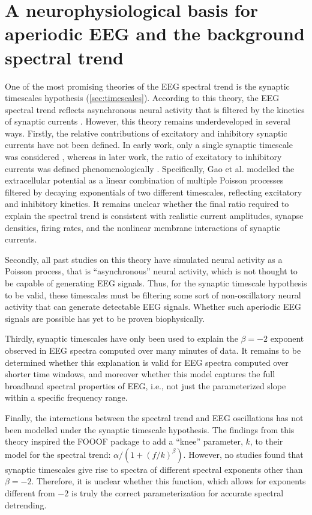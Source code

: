 \chapter{A neurophysiological basis for aperiodic EEG and the background spectral trend} \label{sec:natcomms}

One of the most promising theories of the EEG spectral trend is the synaptic timescales hypothesis (\autoref{sec:timescales}). According to this theory, the EEG spectral trend reflects asynchronous neural activity that is filtered by the kinetics of synaptic currents \cite{Bedard2006,Miller2009, Gao2017}. However, this theory remains underdeveloped in several ways. Firstly, the relative contributions of excitatory and inhibitory synaptic currents have not been defined. In early work, only a single synaptic timescale was considered \cite{Bedard2006,Miller2009}, whereas in later work, the ratio of excitatory to inhibitory currents was defined phenomenologically \cite{Gao2017}. Specifically, Gao et al. \cite{Gao2017} modelled the extracellular potential as a linear combination of multiple Poisson processes filtered by decaying exponentials of two different timescales, reflecting excitatory and inhibitory kinetics. It remains unclear whether the final ratio required to explain the spectral trend is consistent with realistic current amplitudes, synapse densities, firing rates, and the nonlinear membrane interactions of synaptic currents. 

Secondly, all past studies on this theory have simulated neural activity as a Poisson process, that is ``asynchronous'' neural activity, which is not thought to be capable of generating EEG signals. Thus, for the synaptic timescale hypothesis to be valid, these timescales must be filtering some sort of non-oscillatory neural activity that can generate detectable EEG signals. Whether such aperiodic EEG signals are possible has yet to be proven biophysically.

Thirdly, synaptic timescales have only been used to explain the $\beta=-2$ exponent observed in EEG spectra computed over many minutes of data. It remains to be determined whether this explanation is valid for EEG spectra computed over shorter time windows, and moreover whether this model captures the full broadband spectral properties of EEG, i.e., not just the parameterized slope within a specific frequency range. 

Finally, the interactions between the spectral trend and EEG oscillations has not been modelled under the synaptic timescale hypothesis. The findings from this theory inspired the FOOOF package to add a ``knee'' parameter, $k$, to their model for the spectral trend: $\alpha/(1+(f/k)^\beta)$. However, no studies found that synaptic timescales give rise to spectra of different spectral exponents other than $\beta=-2$. Therefore, it is unclear whether this function, which allows for exponents different from $-2$ is truly the correct parameterization for accurate spectral detrending. 

